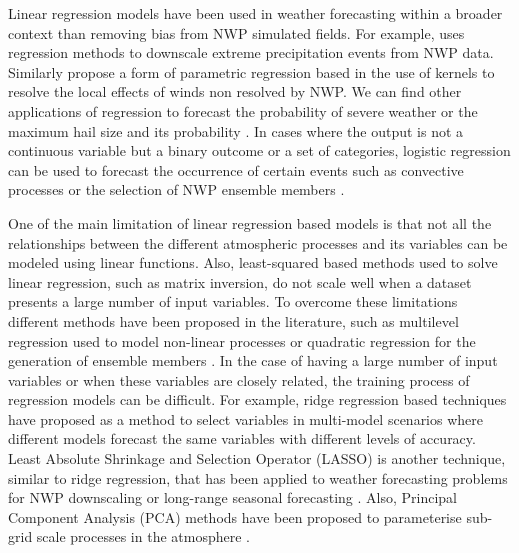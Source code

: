 \medskip

Linear regression models have been used in weather forecasting within a broader context than removing bias from NWP simulated fields. For example, \citep{friederichs2007statistical} uses regression methods to downscale extreme precipitation events from NWP data. Similarly \citep{rozas2014method} propose a form of parametric regression based in the use of kernels to resolve the local effects of winds non resolved by NWP. We can find other applications of regression to forecast the probability of severe weather \citep{kitzmiller1995wsr} or the maximum hail size and its probability \citep{billet1997use}. In cases where the output is not a continuous variable but a binary outcome or a set of categories, logistic regression can be used to forecast the occurrence of certain events such as convective processes \citep{mecikalski2015probabilistic} or the selection of NWP ensemble members \citep{messner2014heteroscedastic}.

\medskip

One of the main limitation of linear regression based models is that not all the relationships between the different atmospheric processes and its variables can be modeled using linear functions. Also, least-squared based methods used to solve linear regression, such as matrix inversion, do not scale well when a dataset presents a large number of input variables. To overcome these limitations different methods have been proposed in the literature, such as multilevel regression used to model non-linear processes \citep{kravtsov2005multilevel} or quadratic regression for the generation of ensemble members \citep{hodyss2013square}. In the case of having a large number of input variables or when these variables are closely related, the training process of regression models can be difficult. For example, ridge regression based techniques have proposed as a method to select variables in multi-model scenarios \citep{delsole2013scale} where different models forecast the same variables with different levels of accuracy. Least Absolute Shrinkage and Selection Operator (LASSO) is another technique, similar to ridge regression, that has been applied to weather forecasting problems for NWP downscaling \citep{hofer2017evaluating} or long-range seasonal forecasting \citep{delsole2017statistical}. Also, Principal Component Analysis (PCA) methods have been proposed to parameterise sub-grid scale processes in the atmosphere \citep{godfrey2010empirical}.

\medskip


